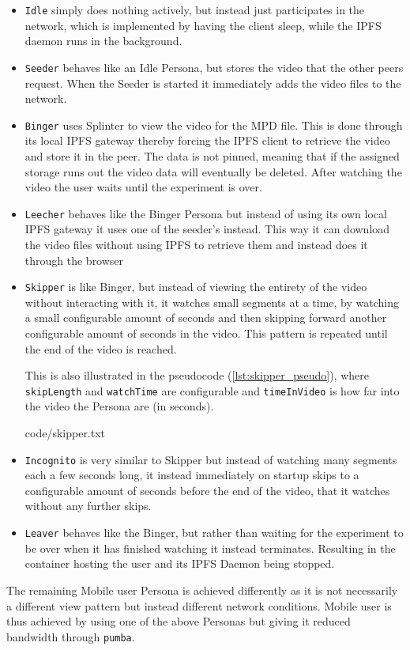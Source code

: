 \begin{itemize}
    \item \texttt{Idle} simply does nothing actively, but instead just participates in the network, which is implemented by having the client sleep, while the \ac{IPFS} daemon runs in the background.
    
    \item \texttt{Seeder} behaves like an Idle Persona, but stores the video that the other peers request. When the Seeder is started it immediately adds the video files to the network.
    
    \item \texttt{Binger} uses Splinter to view the video for the \ac{MPD} file. This is done through its local \ac{IPFS} gateway thereby forcing the \ac{IPFS} client to retrieve the video and store it in the peer. The data is not pinned, meaning that if the assigned storage runs out the video data will eventually be deleted. After watching the video the user waits until the experiment is over.
    
    \item \texttt{Leecher} behaves like the Binger Persona but instead of using its own local \ac{IPFS} gateway it uses one of the seeder's instead. This way it can download the video files without using \ac{IPFS} to retrieve them and instead does it through the browser
    
    \item \texttt{Skipper} is like Binger, but instead of viewing the entirety of the video without interacting with it, it watches small segments at a time, by watching a small configurable amount of seconds and then skipping forward another configurable amount of seconds  in the video. This pattern is repeated until the end of the video is reached. 
    
    This is also illustrated in the pseudocode (\autoref{lst:skipper_pseudo}), where \texttt{skipLength} and \texttt{watchTime} are configurable and \texttt{timeInVideo} is how far into the video the Persona are (in seconds).
    
    {code/skipper.txt}
    
    \item \texttt{Incognito} is very similar to Skipper but instead of watching many segments each a few seconds long, it instead immediately on startup skips to a configurable amount of seconds before the end of the video, that it watches without any further skips.
    
    \item \texttt{Leaver} behaves like the Binger, but rather than waiting for the experiment to be over when it has finished watching it instead terminates. Resulting in the container hosting the user and its \ac{IPFS} Daemon being stopped.
\end{itemize}
The remaining Mobile user Persona is achieved differently as it is not necessarily a different view pattern but instead different network conditions. Mobile user is thus achieved by using one of the above Personas but giving it reduced bandwidth through \texttt{pumba}.

